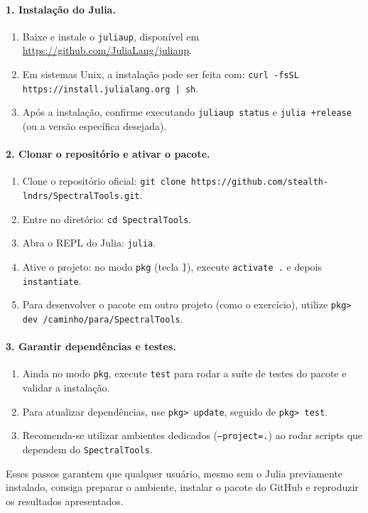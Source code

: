 \paragraph{1. Instalação do Julia.}
\begin{enumerate}
    \item Baixe e instale o \texttt{juliaup}, disponível em
    \url{https://github.com/JuliaLang/juliaup}.
    \item Em sistemas Unix, a instalação pode ser feita com:
    \texttt{curl -fsSL https://install.julialang.org | sh}.
    \item Após a instalação, confirme executando \texttt{juliaup status}
    e \texttt{julia +release} (ou a versão específica desejada).
\end{enumerate}

\paragraph{2. Clonar o repositório e ativar o pacote.}
\begin{enumerate}
    \item Clone o repositório oficial:
    \texttt{git clone https://github.com/stealth-lndrs/SpectralTools.git}.
    \item Entre no diretório: \texttt{cd SpectralTools}.
    \item Abra o REPL do Julia: \texttt{julia}.
    \item Ative o projeto: no modo \texttt{pkg} (tecla \texttt{]}), execute
    \texttt{activate .} e depois \texttt{instantiate}.
    \item Para desenvolver o pacote em outro projeto (como o exercício),
    utilize \texttt{pkg> dev /caminho/para/SpectralTools}.
\end{enumerate}

\paragraph{3. Garantir dependências e testes.}
\begin{enumerate}
    \item Ainda no modo \texttt{pkg}, execute \texttt{test} para rodar a suíte
    de testes do pacote e validar a instalação.
    \item Para atualizar dependências, use \texttt{pkg> update}, seguido de
    \texttt{pkg> test}.
    \item Recomenda-se utilizar ambientes dedicados (\texttt{--project=.}) ao
    rodar scripts que dependem do \texttt{SpectralTools}.
\end{enumerate}

Esses passos garantem que qualquer usuário, mesmo sem o Julia previamente
instalado, consiga preparar o ambiente, instalar o pacote do GitHub e
reproduzir os resultados apresentados.
